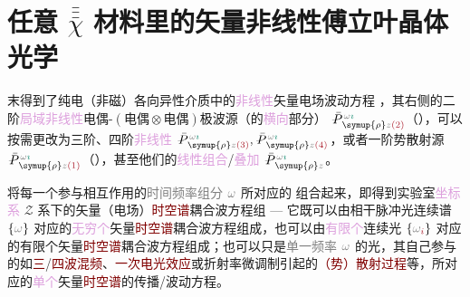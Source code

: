 
\chapter{任意 \texorpdfstring{$\bar{\bar{\bar{\chi}}}$}{$\bar{\bar{\bar{\text{χ}}}}$} 材料里的矢量非线性傅立叶晶体光学}\label{chap:NFCO}

 末得到了\textcolor{PineGreen}{纯电（非磁）各向异性}介质中的\textcolor{Plum}{非线性}矢量电场波动方程 ，其右侧的二阶\textcolor{Plum}{局域}\textcolor{Plum}{非线性}\textcolor{NavyBlue}{电偶-$(\text{电偶}\otimes\text{电偶})$}极\textcolor{NavyBlue}{波源}（的\textcolor{Plum}{横向}部分） $\xint{\mathcolor{gray}{-}}{25}{\bar{P}}^{\;\! \mathcolor{gray}{\omega} \textcolor{PineGreen}{\imath}}_{\;\! \symup{\rho} \mathcolor{gray}{z} \textcolor{Maroon}{(2)}}$（），可以按需更改为三阶、四阶\textcolor{Plum}{非线性} $\xint{\mathcolor{gray}{-}}{25}{\bar{P}}^{\;\! \mathcolor{gray}{\omega} \textcolor{PineGreen}{\imath}}_{\;\! \symup{\rho} \mathcolor{gray}{z} \textcolor{Maroon}{(3)}}, \xint{\mathcolor{gray}{-}}{25}{\bar{P}}^{\;\! \mathcolor{gray}{\omega} \textcolor{PineGreen}{\imath}}_{\;\! \symup{\rho} \mathcolor{gray}{z} \textcolor{Maroon}{(4)}}$，或者一阶\textcolor{NavyBlue}{势散射}源 $\xint{\mathcolor{gray}{-}}{25}{\bar{P}}^{\;\! \mathcolor{gray}{\omega} \textcolor{PineGreen}{\imath}}_{\;\! \symup{\rho} \mathcolor{gray}{z} \textcolor{Maroon}{(1)}}$（），甚至他们的\textcolor{Plum}{线性组合}/\textcolor{Plum}{叠加} $\xint{\mathcolor{gray}{-}}{25}{\bar{P}}^{\;\! \mathcolor{gray}{\omega} \textcolor{PineGreen}{\imath}}_{\;\! \symup{\rho} \mathcolor{gray}{z}}$。

将每一个参与相互作用的\textcolor{gray}{时间频率组分} $\mathcolor{gray}{\omega}$ 所对应的  组合起来，即得到\textcolor{PineGreen}{实验室}\textcolor{Plum}{坐标系} \textcolor{PineGreen}{$\mathcal{Z}$ 系}下的矢量（电场）\textcolor{Maroon}{时空谱}耦合波方程组 --- 它既可以由相干\textcolor{NavyBlue}{脉冲光连续谱} $\left\{ \mathcolor{gray}{\omega} \right\}$ 对应的\textcolor{Plum}{无穷个}矢量\textcolor{Maroon}{时空谱}耦合波方程组成，也可以由\textcolor{Plum}{有限个}\textcolor{NavyBlue}{连续光} $\left\{ \mathcolor{gray}{\omega}_{\textcolor{Maroon}{i}} \right\}$ 对应的有限个矢量\textcolor{Maroon}{时空谱}耦合波方程组成；也可以只是\textcolor{gray}{单一频率} $\mathcolor{gray}{\omega}$ 的光，其自己参与的如\textcolor{Maroon}{三}/\textcolor{Maroon}{四波混频}、\textcolor{Maroon}{一次电光效应}或\textcolor{PineGreen}{折射率微调制}引起的\textcolor{Maroon}{（势）散射过程}等，所对应的\textcolor{Plum}{单个}矢量\textcolor{Maroon}{时空谱}的传播/波动方程。

